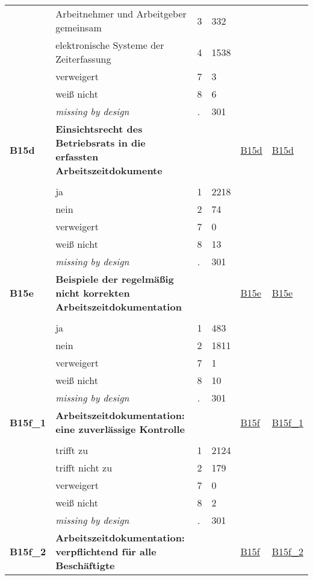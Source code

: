\begin{longtable}{| L{2.45cm} | L{6cm} | C{1.5cm} | R{1cm} | C{2.25cm} | C{2.25cm} |}
   & Arbeitnehmer und Arbeitgeber gemeinsam & 3 & 332 &  &  \\ 
   & elektronische Systeme der Zeiterfassung & 4 & 1538 &  &  \\ 
   & verweigert & 7 & 3 &  &  \\ 
   & weiß nicht & 8 & 6 &  &  \\ 
   & \textit{missing by design} & \textit{.} & 301 &  &  \\ 
   \midrule
\textbf{B15d}\label{var:B15d} & \textbf{Einsichtsrecht des Betriebsrats in die erfassten Arbeitszeitdokumente} &  &  & \hyperref[B15d]{B15d} & \hyperref[var:suf:B15d]{B15d} \\ 
   &  &  &  &  &  \\ 
   & ja & 1 & 2218 &  &  \\ 
   & nein & 2 & 74 &  &  \\ 
   & verweigert & 7 & 0 &  &  \\ 
   & weiß nicht & 8 & 13 &  &  \\ 
   & \textit{missing by design} & \textit{.} & 301 &  &  \\ 
   \midrule
\textbf{B15e}\label{var:B15e} & \textbf{Beispiele der regelmäßig nicht korrekten Arbeitszeitdokumentation} &  &  & \hyperref[B15e]{B15e} & \hyperref[var:suf:B15e]{B15e} \\ 
   &  &  &  &  &  \\ 
   & ja & 1 & 483 &  &  \\ 
   & nein & 2 & 1811 &  &  \\ 
   & verweigert & 7 & 1 &  &  \\ 
   & weiß nicht & 8 & 10 &  &  \\ 
   & \textit{missing by design} & \textit{.} & 301 &  &  \\ 
   \midrule
\textbf{B15f\_1}\label{var:B15f:1} & \textbf{Arbeitszeitdokumentation: eine zuverlässige Kontrolle} &  &  & \hyperref[B15f]{B15f} & \hyperref[var:suf:B15f:1]{B15f\_1} \\ 
   &  &  &  &  &  \\ 
   & trifft zu & 1 & 2124 &  &  \\ 
   & trifft nicht zu & 2 & 179 &  &  \\ 
   & verweigert & 7 & 0 &  &  \\ 
   & weiß nicht & 8 & 2 &  &  \\ 
   & \textit{missing by design} & \textit{.} & 301 &  &  \\ 
   \midrule
\textbf{B15f\_2}\label{var:B15f:2} & \textbf{Arbeitszeitdokumentation: verpflichtend für alle Beschäftigte} &  &  & \hyperref[B15f]{B15f} & \hyperref[var:suf:B15f:2]{B15f\_2} \\ 

\end{longtable}

